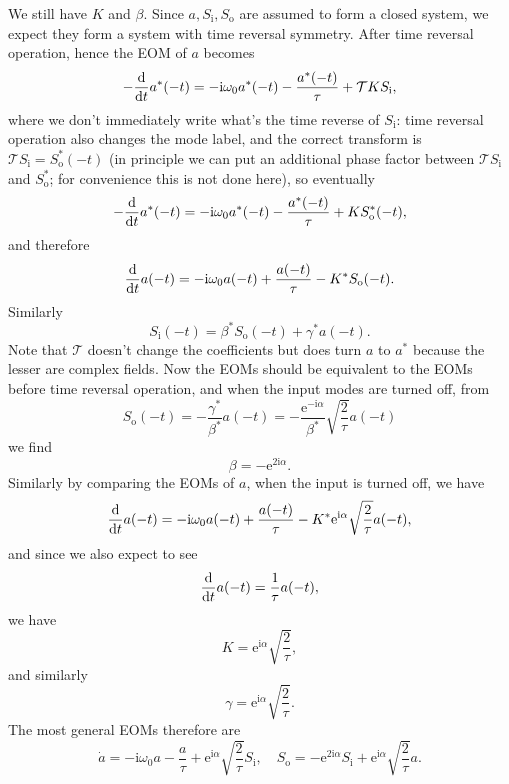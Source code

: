 \documentclass[hyperref, a4paper]{article}
\newcommand*{\ii}{\mathrm{i}}
\newcommand*{\ee}{\mathrm{e}}
\newcommand*{\Si}{S_{\text{i}}}
\newcommand*{\So}{S_{\text{o}}}
\newcommand*{\Tre}{\mathcal{T}}
\begin{document}
We still have $K$ and $\beta$. Since $a, \Si, \So$ are assumed to form a closed system, 
we expect they form a system with time reversal symmetry.
After time  reversal operation, hence the EOM of $a$ becomes 
\begin{equation}
    -\dv{t} a^*(-t) = - \ii \omega_0 a^*(-t) - \frac{a^*(-t)}{\tau} + \Tre{K S_{\text{i}}},
\end{equation} 
where we don't immediately write what's the time reverse of $S_{\text{i}}$:
time reversal operation also changes the mode label, 
and the correct transform is $\Tre{S_{\text{i}}} = \So^*(-t)$
(in principle we can put an additional phase factor between $\Tre \Si$ and $\So^*$; 
for convenience this is not done here), 
so eventually 
\begin{equation}
    -\dv{t} a^*(-t) = - \ii \omega_0 a^*(-t) - \frac{a^*(-t)}{\tau} + K \So^*(-t),
\end{equation}
and therefore 
\begin{equation}
    \dv{t} a(-t) = - \ii \omega_0 a(-t) + \frac{a(-t)}{\tau} - K^* \So(-t).
\end{equation}
Similarly 
\begin{equation}
    \Si(-t) = \beta^* \So(-t) + \gamma^* a(-t).
\end{equation}
Note that $\Tre$ doesn't change the coefficients but does turn $a$ to $a^*$ 
because the lesser are complex fields.
Now the EOMs should be equivalent to the EOMs before time reversal operation, 
and when the input modes are turned off, from 
\[
    \So(-t) = - \frac{\gamma^*}{\beta^*} a(-t) = - \frac{\ee^{- \ii \alpha}}{\beta^*} \sqrt{\frac{2}{\tau}} a(-t)
\]
we find 
\begin{equation}
    \beta = - \ee^{2 \ii \alpha}.
\end{equation}
Similarly by comparing the EOMs of $a$, when the input is turned off, we have 
\[
    \dv{t} a(-t) = - \ii \omega_0 a(-t) + \frac{a(-t)}{\tau} 
    - K^* \ee^{\ii \alpha} \sqrt{\frac{2}{\tau}} a(-t) ,
\] 
and since we also expect to see 
\[
    \dv{t} a(-t) = \frac{1}{\tau} a(-t),
\]
we have 
\begin{equation}
    K = \ee^{\ii \alpha} \sqrt{\frac{2}{\tau}},
\end{equation} 
and similarly
\begin{equation}
    \gamma = \ee^{\ii \alpha} \sqrt{\frac{2}{\tau}}.
\end{equation}
The most general EOMs therefore are 
\begin{equation}
    \dot{a} = - \ii \omega_0 a - \frac{a}{\tau} + \ee^{\ii \alpha} \sqrt{\frac{2}{\tau}} \Si, \quad 
    \So = - \ee^{2 \ii \alpha} \Si + \ee^{\ii \alpha} \sqrt{\frac{2}{\tau}} a.
\end{equation}
\end{document}
